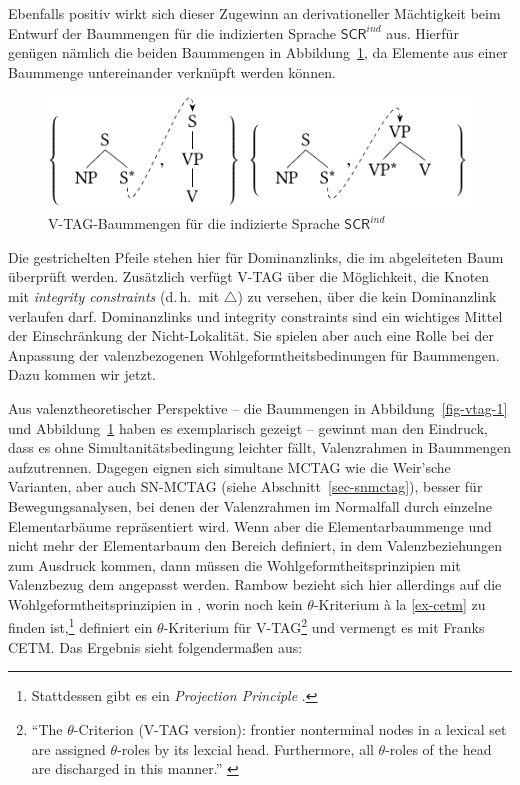 Ebenfalls positiv wirkt sich dieser Zugewinn an derivationeller Mächtigkeit beim Entwurf der Baummengen für die indizierten Sprache $\mathsf{SCR}^{ind}$ aus. Hierfür genügen nämlich die beiden Baummengen in Abbildung~\ref{fig-vtag-2}, da Elemente aus einer Baummenge untereinander verknüpft werden können.  
\begin{figure}[t]
\centering
\includegraphics{graphics/abb67.pdf}
\caption{V-TAG-Baummengen für die indizierte Sprache $\mathsf{SCR}^{ind}$\label{fig-vtag-2}}
\end{figure}
Die gestrichelten Pfeile stehen hier für Dominanzlinks, die im abgeleiteten Baum überprüft werden. Zusätzlich verfügt V-TAG über die Möglichkeit, die Knoten mit {\it integrity constraints} (d.\,h.\ mit $\bigtriangleup$) zu versehen, über die kein Dominanzlink verlaufen darf. Dominanzlinks und integrity constraints sind ein wichtiges Mittel der Einschränkung der Nicht-Lokalität. Sie spielen aber auch eine Rolle bei der Anpassung der valenzbezogenen Wohlgeformtheitsbedinungen für Baummengen. Dazu kommen wir jetzt. 

Aus valenztheoretischer Perspektive -- die Baummengen in Abbildung~\ref{fig-vtag-1} und Abbildung~\ref{fig-vtag-2} haben es exemplarisch gezeigt -- gewinnt man den Eindruck, dass es ohne Simultanitätsbedingung leichter fällt, Valenzrahmen in Baummengen aufzutrennen. Dagegen eignen sich simultane MCTAG wie die Weir'sche Varianten, aber auch SN-MCTAG (siehe Abschnitt~\ref{sec-snmctag}), besser für Bewegungsanalysen, bei denen der Valenzrahmen im Normalfall durch einzelne Elementarbäume repräsentiert wird. Wenn aber die Elementarbaummenge und nicht mehr der Elementarbaum den Bereich definiert, in dem Valenzbeziehungen zum Ausdruck kommen, dann müssen die Wohlgeformtheitsprinzipien mit Valenzbezug dem angepasst werden. Rambow bezieht sich hier allerdings auf die Wohlgeformtheitsprinzipien in \cite{Frank:92}, worin noch kein $\theta$-Kriterium \`a la \ref{ex-cetm} zu finden ist,\footnote{Stattdessen gibt es ein {\it Projection Principle} \cite[56]{Frank:92}.} definiert ein $\theta$-Kriterium für V-TAG\footnote{"`The $\theta$-Criterion (V-TAG version): frontier nonterminal nodes in a lexical set are assigned $\theta$-roles by its lexcial head. Furthermore, all $\theta$-roles of the head are discharged in this manner."' \citep[148]{Rambow:94}} und vermengt es mit Franks CETM. Das Ergebnis sieht folgenderma\ss en aus:
    
